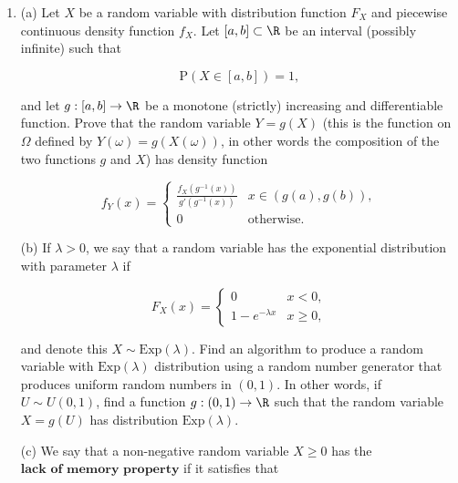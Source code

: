 \begin{enumerate}[label=\arabic*.]
\noindent The $\sigma$-algebra $\sigma({\cal A})$ is called the
$\textbf{$\sigma$-algebra generated by } {\cal A}$.

$\textbf{Hint for (b).}$ Let $({\cal F}_i)_{i\in I}$
be the collection of all $\sigma$-algebras of subsets
of $\Omega$ that contain ${\cal A}$. This is a
non-empty collection, since it contains for example
${\cal P}(\Omega)$, the set of all subsets of
$\Omega$. Any $\sigma$-algebra $\sigma({\cal A})$
that satisfies the two properties above is necessarily
a subset of any of the ${\cal F}_i$'s, hence it is
also contained in the intersection of all the
${\cal F}_i$'s, which is a $\sigma$-algebra by part
(a) of the question.

\item (a) Let $X$ be a random variable with distribution
function $F_X$ and piecewise continuous density
function $f_X$. Let $[a,b] \subset \R$ be an interval
(possibly infinite) such that

\[
\mathrm{P}(X \in [a,b]) = 1,
\]

\noindent and let $g:[a,b]\to\R$ be a monotone (strictly)
increasing and differentiable function. Prove that the
random variable $Y=g(X)$ (this is the function on
$\Omega$ defined by $Y(\omega) = g(X(\omega))$, in
other words the composition of the two functions $g$
and $X$) has density function

\[
f_Y(x) = \begin{cases} \frac{f_X(g^{-1}(x))}{g'(g^{-1}(x))} & x\in (g(a),g(b)), \\ 0 & \textrm{otherwise.} \end{cases}
\]

\noindent (b) If $\lambda>0$, we say that a random variable has
the exponential distribution with parameter $\lambda$
if

\[
F_X(x) = \begin{cases} 0 & x<0, \\ 1-e^{-\lambda x} & x \ge 0, \end{cases}
\]

\noindent and denote this $X \sim \textrm{Exp}(\lambda).$ Find
an algorithm to produce a random variable with
$\textrm{Exp}(\lambda)$ distribution using a random
number generator that produces uniform random numbers
in $(0,1)$. In other words, if $U \sim U(0,1)$, find
a function $g:(0,1)\to\R$ such that the random
variable $X=g(U)$ has distribution
$\textrm{Exp}(\lambda)$.

(c) We say that a non-negative random variable
$X\ge 0$ has the $\textbf{lack of memory property}$
if it satisfies that


\end{enumerate}
